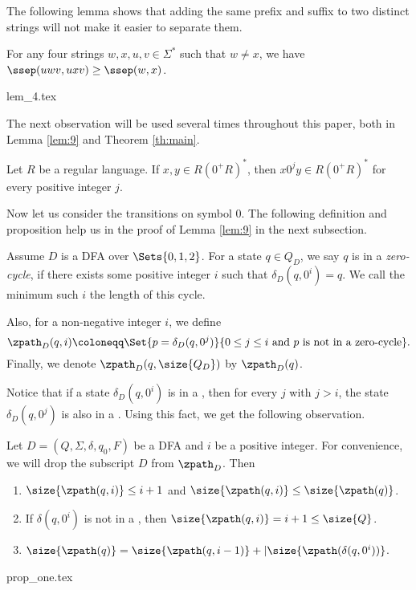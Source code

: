 \documentclass[preprint, 12pt]{elsarticle}
\begin{document}
	
	
	The following lemma shows that adding the same prefix and suffix to two distinct strings will not make it easier to separate them. 
	\begin{lemma}
		\label{lem:4}
		For any four strings $w,x,u,v \in \Sigma^*$ such that $w \neq x$, we have $\ssep(uwv, uxv) \geq \ssep(w, x)$.
	\end{lemma}
	{lem_4.tex}
	
	The next observation will be used several times throughout this paper, both in Lemma \ref{lem:9} and Theorem \ref{th:main}.
	\begin{proposition}
		\label{prp:five}
		Let $R$ be a regular language. If $x, y \in R\left(0^+R\right)^*$, then $x 0^j y \in R\left(0^+R\right)^*$ for every positive integer $j$.
	\end{proposition}	
	
	Now let us consider the transitions on symbol $0$. The following definition and proposition help us in the proof of Lemma \ref{lem:9} in the next subsection.
	\begin{definition}
		Assume $D$ is a DFA over $\Sets{0,1,2}$. For a state $q \in Q_D$, 
		we say $q$ is in a \textit{zero-cycle}, if there exists some positive integer $i$ such that $\delta_D(q, 0^i)=q$. We call the minimum such $i$ the length of this cycle.  
		 
	
		 Also, for a non-negative integer $i$, we define 
		 $$\zpath_D(q,i) \coloneqq \Set{p=\delta_D(q,0^j)}{0 \le j \le i \text{ and } p \text{ is not in a zero-cycle}}.$$
		  Finally, we denote $\zpath_D(q, \size{Q_D})$ by $\zpath_D(q)$.

	\end{definition}
	
	Notice that if a state $\delta_D(q,0^i)$ is in a \zcycle,
	then for every $j$ with $j>i$, the state $\delta_D(q,0^j)$ is also in a \zcycle.
	Using this fact, we get the following observation.
	
	\begin{proposition}
		\label{prp:one}
		 Let $D = (Q,\Sigma,\delta,q_0,F)$ be a DFA and $i$ be a positive integer. For convenience, we will drop the subscript $D$ from $\zpath_D$. Then
		 \begin{enumerate}[label=(\alph*)]
		 	\item 
		 	\label{st:a}
		 		$\size{\zpath(q,i)} \le i+1$ and $\size{\zpath(q,i)} \le \size{\zpath(q)}$.
		 	\item  
		 	\label{st:b}
		 		If $\delta(q,0^i)$ is not in a \zcycle, then $\size{\zpath(q,i)} = i+1 \le \size{Q}$.
		 	\item 
		 	\label{st:c}
		 		$\size{\zpath(q)} = \size{\zpath(q,i-1)} + |\size{\zpath(\delta(q,0^i))}$.
		 \end{enumerate}
	\end{proposition}
	{prop_one.tex}
		
\end{document}
